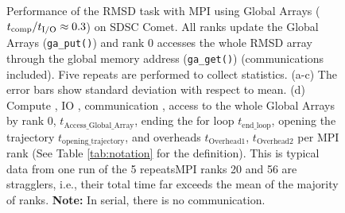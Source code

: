 \begin{figure}[ht!]
\caption{Performance of the RMSD task with MPI using Global Arrays (${t}_{\text{comp}}/{t}_{\text{I/O}} \approx 0.3$) on SDSC Comet.
All ranks update the Global Arrays (\texttt{ga\_put()}) and rank 0 accesses the whole RMSD array through the global memory address (\texttt{ga\_get()}) (communications included).
Five repeats are performed to collect statistics. (a-c) The error bars show standard deviation with respect to mean. 
(d) Compute \tcomp, IO \tIO, communication \tcomm, access to the whole Global Arrays by rank 0, \texttt{$t_{\text{Access\_Global\_Array}}$}, ending the for loop \texttt{$t_{\text{end\_loop}}$},
  opening the trajectory \texttt{$t_{\text{opening\_trajectory}}$}, and overheads \texttt{$t_{\text{Overhead1}}$},  \texttt{$t_{\text{Overhead2}}$} per MPI rank (See Table \ref{tab:notation} for the definition). 
  This is typical data from one run of the 5 repeatsMPI ranks 20 and 56 are stragglers, i.e., 
their total time far exceeds the mean of the majority of ranks. \textbf{Note:} In serial, there is no communication.}
\label{fig:MPIwithIO-ga4py}
\end{figure}

